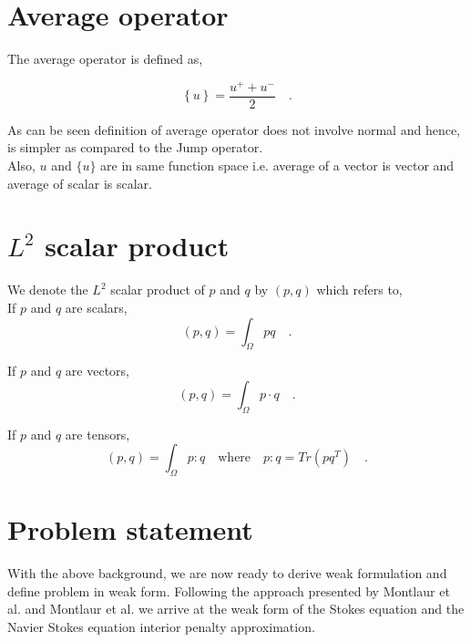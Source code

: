\documentclass[a4paper,openany]{book}
\begin{document}
\section{Average operator}

The average operator is defined as,

\begin{equation}\label{average operator}
\left\lbrace u \right\rbrace = \frac{u^+ + u^-}{2}  \quad \textrm{.}
\end{equation} 

As can be seen definition of average operator does not involve normal and hence, is simpler as compared to the Jump operator.\\
Also, $u$ and $\lbrace u \rbrace$ are in same function space i.e. average of a vector is vector and average of scalar is scalar.\\

\section{$L^2$ scalar product}

We denote the $L^2$ scalar product of $p$ and $q$ by $(p,q)$ which refers to,\\

If $p$ and $q$ are scalars,
\begin{equation}\label{inner product scalars}
(p,q)=\int_{\Omega} pq \quad \textrm{.}
\end{equation}

If $p$ and $q$ are vectors,
\begin{equation}\label{Inner product vectors}
(p,q)=\int_{\Omega} p \cdot q \quad \textrm{.}
\end{equation}

If $p$ and $q$ are tensors,
\begin{equation}\label{Inner product tensors}
(p,q)=\int_{\Omega} p : q \quad \textrm{where} \quad p:q = Tr(pq^T) \quad \textrm{.}
\end{equation}

\section{Problem statement}

With the above background, we are now ready to derive weak formulation and define problem in weak form. Following the approach presented by Montlaur et al. \cite{Montlaur} and Montlaur et al. \cite{Montlaur2} we arrive at the weak form of the Stokes equation and the Navier Stokes equation interior penalty approximation.
\end{document}
